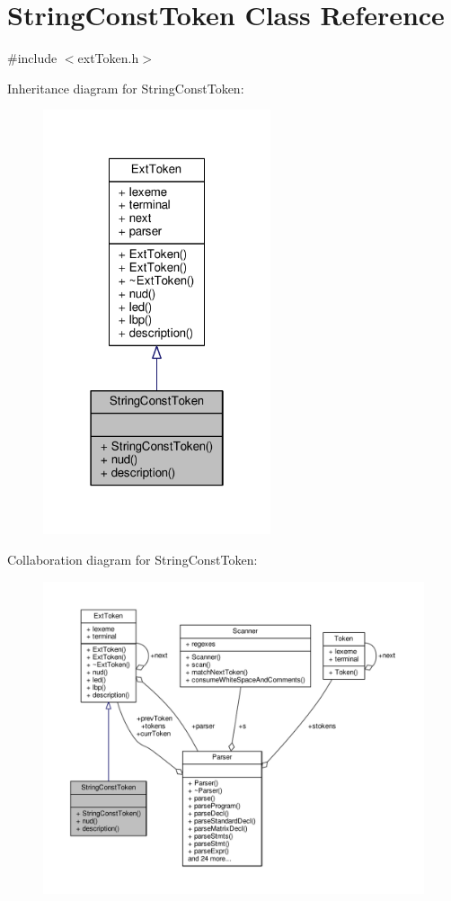 \hypertarget{classStringConstToken}{\section{String\-Const\-Token Class Reference}
\label{classStringConstToken}
}


{\ttfamily \#include $<$ext\-Token.\-h$>$}



Inheritance diagram for String\-Const\-Token\-:\nopagebreak
\begin{figure}[H]
\begin{center}
\leavevmode
\includegraphics[width=190pt]{classStringConstToken__inherit__graph}
\end{center}
\end{figure}


Collaboration diagram for String\-Const\-Token\-:\nopagebreak
\begin{figure}[H]
\begin{center}
\leavevmode
\includegraphics[width=350pt]{classStringConstToken__coll__graph}
\end{center}
\end{figure}
